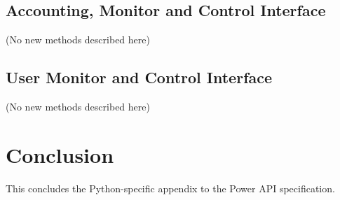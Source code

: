 \subsection{Accounting, Monitor and Control
Interface}\label{sec:PythonAccountingMonitorControlInterface}
(No new methods described here)

\subsection{User Monitor and Control
Interface}\label{sec:PythonUserMonitorControlInterface}
(No new methods described here)

\section{Conclusion}\label{sec:PythonConclusion}
This concludes the Python-specific appendix to the Power API specification.

